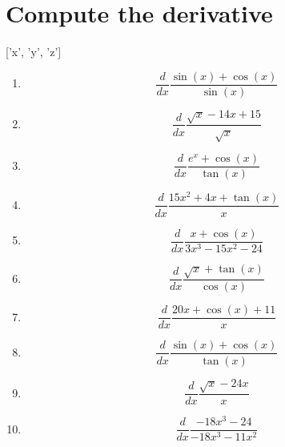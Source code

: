 \documentclass{article}
\begin{document}
        \section{Compute the derivative}
        ['x', 'y', 'z']
        \begin{multicols}{1}
        \begin{enumerate}
        \item $$\frac{d}{d x} \frac{\sin{\left(x \right)} + \cos{\left(x \right)}}{\sin{\left(x \right)}}$$
\item $$\frac{d}{d x} \frac{\sqrt{x} - 14 x + 15}{\sqrt{x}}$$
\item $$\frac{d}{d x} \frac{e^{x} + \cos{\left(x \right)}}{\tan{\left(x \right)}}$$
\item $$\frac{d}{d x} \frac{15 x^{2} + 4 x + \tan{\left(x \right)}}{x}$$
\item $$\frac{d}{d x} \frac{x + \cos{\left(x \right)}}{3 x^{3} - 15 x^{2} - 24}$$
\item $$\frac{d}{d x} \frac{\sqrt{x} + \tan{\left(x \right)}}{\cos{\left(x \right)}}$$
\item $$\frac{d}{d x} \frac{20 x + \cos{\left(x \right)} + 11}{x}$$
\item $$\frac{d}{d x} \frac{\sin{\left(x \right)} + \cos{\left(x \right)}}{\tan{\left(x \right)}}$$
\item $$\frac{d}{d x} \frac{\sqrt{x} - 24 x}{x}$$
\item $$\frac{d}{d x} \frac{- 18 x^{3} - 24}{- 18 x^{3} - 11 x^{2}}$$
        \end{enumerate}
        \end{multicols}
        

    
\end{document}

